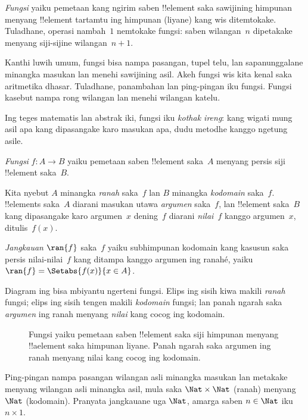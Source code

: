 \documentclass[../../../include/open-logic-section]{subfiles}
\begin{document}

\begin{explain}
\emph{Fungsi} yaiku pemetaan kang ngirim saben !!{element}
saka sawijining himpunan menyang !!{element} tartamtu
ing himpunan (liyane) kang wis ditemtokake.
Tuladhane, operasi nambah~$1$ nemtokake fungsi:
saben wilangan~$n$ dipetakake menyang siji-sijine
wilangan~$n+1$.

Kanthi luwih umum, fungsi bisa nampa pasangan,
tupel telu, lan sapanunggalane minangka masukan
lan menehi sawijining asil. Akeh fungsi wis kita
kenal saka aritmetika dhasar. Tuladhane, panambahan
lan ping-pingan iku fungsi. Fungsi kasebut nampa
rong wilangan lan menehi wilangan katelu.

Ing teges matematis lan abstrak iki, fungsi iku
\emph{kothak ireng}: kang wigati mung asil apa
kang dipasangake karo masukan apa, dudu
metodhe kanggo ngetung asile.
\end{explain}

\begin{defn}[Fungsi]
\emph{Fungsi} $f \colon A \to B$ yaiku pemetaan
saben !!{element} saka~$A$ menyang persis siji !!{element} saka~$B$.

Kita nyebut $A$ minangka \emph{ranah} saka~$f$
lan $B$ minangka \emph{kodomain} saka~$f$.
!!{element}s saka~$A$ diarani masukan utawa
\emph{argumen} saka~$f$, lan !!{element}
saka~$B$ kang dipasangake karo argumen~$x$
dening~$f$ diarani \emph{nilai~$f$}
kanggo argumen~$x$, ditulis~$f(x)$.

\emph{Jangkauan} $\ran{f}$ saka~$f$ yaiku
subhimpunan kodomain kang kasusun saka persis nilai-nilai~$f$
kang ditampa kanggo argumen ing ranahé, yaiku
$\ran{f} =\Setabs{f(x)}{x \in A}$.
\end{defn}

Diagram ing  bisa mbiyantu
ngerteni fungsi. Elips ing sisih kiwa makili
\emph{ranah} fungsi; elips ing sisih tengen
makili \emph{kodomain} fungsi; lan panah
ngarah saka \emph{argumen} ing ranah
menyang \emph{nilai} kang cocog ing kodomain.

\begin{figure}
  \caption{Fungsi yaiku pemetaan saben !!{element}
    saka siji himpunan menyang !!a{element}
    saka himpunan liyane. Panah ngarah
    saka argumen ing ranah menyang nilai
    kang cocog ing kodomain.}
\end{figure}

\begin{ex}
Ping-pingan nampa pasangan wilangan asli
minangka masukan lan metakake menyang wilangan
asli minangka asil, mula saka
$\Nat \times \Nat$ (ranah) menyang $\Nat$ (kodomain).
Pranyata jangkauane uga $\Nat$,
amarga saben $n \in \Nat$ iku $n \times 1$.
\end{ex}
\end{document}
